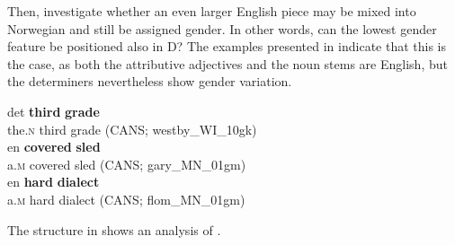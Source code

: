\documentclass[output=paper]{langscibook}
\begin{document}
Then, \citet{ÅfarliEtAl2021} investigate whether an even larger English piece may be mixed into Norwegian and still be assigned gender. In other words, can the lowest gender feature be positioned also in D? The examples presented in  indicate that this is the case, as both the attributive adjectives and the noun stems are English, but the determiners nevertheless show gender variation.


\ea \label{ex:riksem:13}
\ea \label{ex:riksem:13a}
	\gll det \textbf{third} \textbf{grade}\\
		 the.\textsc{n} third grade (CANS; %
         westby\_WI\_10gk)\\
\ex \label{ex:riksem:13b}
	\gll en \textbf{covered} \textbf{sled}\\
		 a.\textsc{m} covered sled (CANS; %
         gary\_MN\_01gm)\\
\ex \label{ex:riksem:13c}
	\gll en \textbf{hard} \textbf{dialect}\\
		 a.\textsc{m} hard dialect (CANS; %
         flom\_MN\_01gm)\\
\z
\z



The structure in  shows an analysis of .
\end{document}
